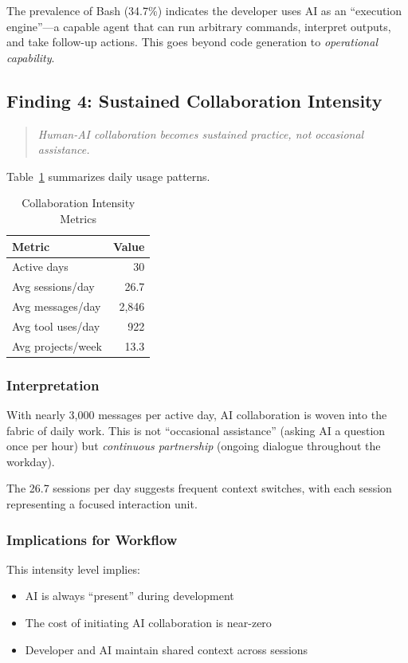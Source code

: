 The prevalence of Bash (34.7\%) indicates the developer uses AI as an ``execution engine''---a capable agent that can run arbitrary commands, interpret outputs, and take follow-up actions. This goes beyond code generation to \textit{operational capability}.

\subsection{Finding 4: Sustained Collaboration Intensity}

\begin{quote}
\textit{Human-AI collaboration becomes sustained practice, not occasional assistance.}
\end{quote}

Table~\ref{tab:intensity} summarizes daily usage patterns.

\begin{table}[h]
\caption{Collaboration Intensity Metrics}
\label{tab:intensity}
\begin{tabular}{lr}
\toprule
\textbf{Metric} & \textbf{Value} \\
\midrule
Active days & 30 \\
Avg sessions/day & 26.7 \\
Avg messages/day & 2,846 \\
Avg tool uses/day & 922 \\
Avg projects/week & 13.3 \\
\bottomrule
\end{tabular}
\end{table}

\subsubsection{Interpretation}

With nearly 3,000 messages per active day, AI collaboration is woven into the fabric of daily work. This is not ``occasional assistance'' (asking AI a question once per hour) but \textit{continuous partnership} (ongoing dialogue throughout the workday).

The 26.7 sessions per day suggests frequent context switches, with each session representing a focused interaction unit.

\subsubsection{Implications for Workflow}

This intensity level implies:
\begin{itemize}
    \item AI is always ``present'' during development
    \item The cost of initiating AI collaboration is near-zero
    \item Developer and AI maintain shared context across sessions
\end{itemize}

